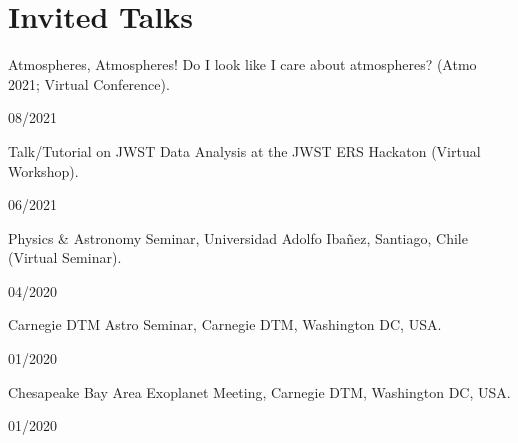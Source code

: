 \documentclass[12pt, a4paper]{article} %
\begin{document}
\section*{Invited Talks}
\begin{minipage}[t]{0.7\textwidth}
\begin{flushleft}%
  \setlength{\leftskip}{0.2cm}%
Atmospheres, Atmospheres! Do I look like I care about atmospheres? (Atmo 2021; Virtual Conference).
\end{flushleft}
\end{minipage}
\begin{minipage}[t]{0.3\textwidth}
\hfill 08/2021
\end{minipage}
\vspace{0.2cm}

\begin{minipage}[t]{0.7\textwidth}
\begin{flushleft}%
  \setlength{\leftskip}{0.2cm}%
Talk/Tutorial on JWST Data Analysis at the JWST ERS Hackaton (Virtual Workshop).
\end{flushleft}
\end{minipage}
\begin{minipage}[t]{0.3\textwidth}
\hfill 06/2021
\end{minipage}
\vspace{0.2cm}

\begin{minipage}[t]{0.7\textwidth}
\begin{flushleft}%
  \setlength{\leftskip}{0.2cm}%
Physics \& Astronomy Seminar, Universidad Adolfo Iba\~nez, Santiago, Chile (Virtual Seminar).
\end{flushleft}
\end{minipage}
\begin{minipage}[t]{0.3\textwidth}
\hfill 04/2020
\end{minipage}
\vspace{0.2cm}

\begin{minipage}[t]{0.7\textwidth}
\begin{flushleft}%
  \setlength{\leftskip}{0.2cm}%
Carnegie DTM Astro Seminar, Carnegie DTM, Washington DC, USA.
\end{flushleft}
\end{minipage}
\begin{minipage}[t]{0.3\textwidth}
\hfill 01/2020
\end{minipage}
\vspace{0.2cm}

\begin{minipage}[t]{0.7\textwidth}
\begin{flushleft}%
  \setlength{\leftskip}{0.2cm}%
Chesapeake Bay Area Exoplanet Meeting, Carnegie DTM, Washington DC, USA.
\end{flushleft}
\end{minipage}
\begin{minipage}[t]{0.3\textwidth}
\hfill 01/2020
\end{minipage}
\vspace{0.2cm}
\end{document}
